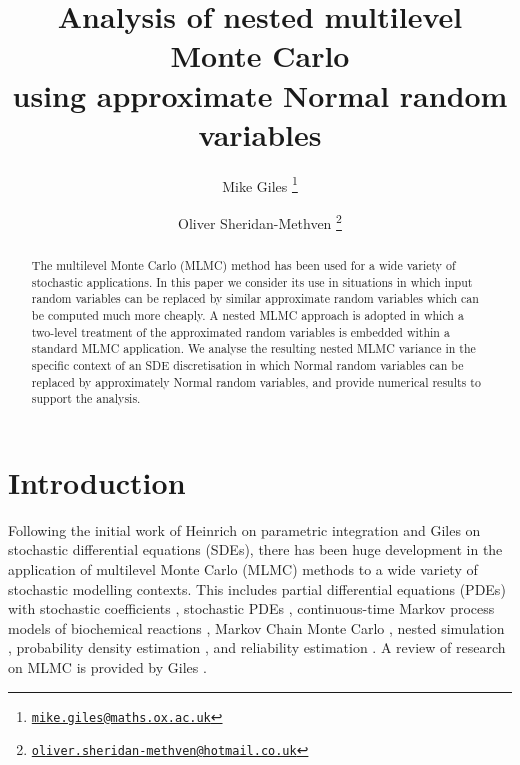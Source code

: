 \documentclass[11pt]{article}
\begin{document}
\title{Analysis of nested multilevel Monte Carlo \\ using approximate Normal random variables}

\author{
Mike Giles
\thanks{\href{mailto:mike.giles@maths.ox.ac.uk}%
{\texttt{mike.giles@maths.ox.ac.uk}}}
\and 
Oliver Sheridan-Methven
\thanks{\href{mailto:oliver.sheridan-methven@hotmail.co.uk}%
{\texttt{oliver.sheridan-methven@hotmail.co.uk}}}
}

\maketitle

\begin{abstract}
  The multilevel Monte Carlo (MLMC) method has been used for a wide variety
  of stochastic applications.  In this paper we consider its use in situations
  in which input random variables can be replaced by similar approximate random
  variables which can be computed much more cheaply.  A nested MLMC approach is
  adopted in which a two-level treatment of the approximated random variables
  is embedded within a standard MLMC application. We analyse the resulting
  nested MLMC variance in the specific context of an SDE discretisation in
  which Normal random variables can be replaced by approximately Normal
  random variables, and provide numerical results to support the analysis.
\end{abstract}


\section{Introduction}

Following the initial work of Heinrich \cite{heinrich98} on parametric
integration and Giles \cite{giles08} on stochastic differential equations
(SDEs), there has been huge development in the application of multilevel
Monte Carlo (MLMC) methods to a wide variety of stochastic modelling
contexts. This includes partial differential equations (PDEs) with
stochastic coefficients \cite{cgst11,bsz11}, stochastic PDEs \cite{gr12},
continuous-time Markov process models of biochemical reactions
\cite{ah12,ahs14},
Markov Chain Monte Carlo \cite{hss13,sst17},
nested simulation \cite{bhr15,gg19},
probability density estimation \cite{gnr15,bc16},
and reliability estimation \cite{up15,ehm16}.
A review of research on MLMC is provided by Giles \cite{giles15}.
\end{document}
